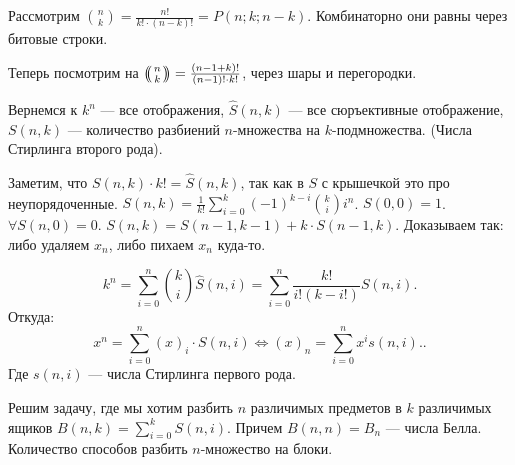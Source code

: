  Рассмотрим $\binom{n}{k} = \frac{n!}{k! \cdot (n-k)!} = P(n; k; n - k)$. Комбинаторно они равны через битовые строки.

 Теперь посмотрим на  $\multiset{n}{k} = \frac{(n-1+k)!}{(n-1)! \cdot k!}$, через шары и перегородки.

 Вернемся к $k^n$ --- все отображения,  $\widehat{S}(n, k)$ --- все сюръективные отображение,  $S(n, k)$ --- количество разбиений  $n$-множества на  $k$-подмножества. (Числа Стирлинга второго рода).

 Заметим, что  $S(n, k) \cdot k! = \widehat{S}(n, k)$, так как  в  $S$ с крышечкой это про неупорядоченные.  $S(n, k) = \frac{1}{k!}\sum_{i=0}^k (-1)^{k-i} \binom{k}{i}i^n$. $S(0, 0) = 1$.  $\forall S(n,0) = 0$. $S(n, k) = S(n-1, k-1) + k\cdot S(n-1, k)$. Доказываем так: либо удаляем  ${x_n}$, либо пихаем  ${x_n}$ куда-то.

 \[
     k^n = \sum_{i=0}^n \binom{k}{i} \widehat{S}(n, i) = \sum_{i=0}^n \frac{k!}{i!(k-i!)} S(n, i)
.\] 
Откуда: \[
    x^n = \sum_{i=0}^n (x)_i \cdot S(n, i) \iff (x)_n = \sum_{i=0}^n x^i s(n, i).
.\] 
Где $s(n,i)$ --- числа Стирлинга первого рода.

Решим задачу, где мы хотим разбить $n$ различимых предметов в $k$ различимых ящиков  $B(n, k) = \sum_{i=0}^k S(n, i)$. Причем $B(n, n) = B_n$ --- числа Белла. Количество способов разбить $n$-множество на блоки. 
